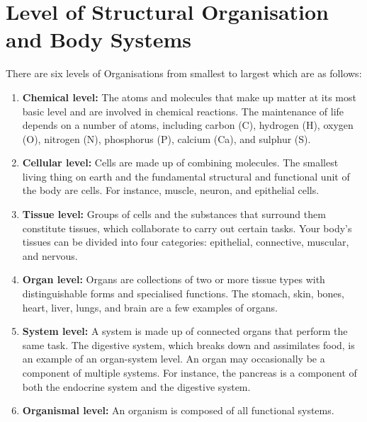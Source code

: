 \documentclass[12pt]{article}
\begin{document}
\section{Level of Structural Organisation and Body Systems}
There are six levels of Organisations from smallest to largest which are as follows:
\begin{enumerate}
    \item \textbf{Chemical level:} The atoms and molecules that make up matter at its most basic level and are involved in chemical reactions. The maintenance of life depends on a number of atoms, including carbon (C), hydrogen (H), oxygen (O), nitrogen (N), phosphorus (P), calcium (Ca), and sulphur (S).
    \item \textbf{Cellular level:} Cells are made up of combining molecules. The smallest living thing on earth and the fundamental structural and functional unit of the body are cells. For instance, muscle, neuron, and epithelial cells.
    \item \textbf{Tissue level:} Groups of cells and the substances that surround them constitute tissues, which collaborate to carry out certain tasks. Your body's tissues can be divided into four categories: epithelial, connective, muscular, and nervous. 
    \item \textbf{Organ level:} Organs are collections of two or more tissue types with distinguishable forms and specialised functions. The stomach, skin, bones, heart, liver, lungs, and brain are a few examples of organs.
    \item \textbf{System level:}  A system is made up of connected organs that perform the same task. The digestive system, which breaks down and assimilates food, is an example of an organ-system level. An organ may occasionally be a component of multiple systems. For instance, the pancreas is a component of both the endocrine system and the digestive system.

    \item \textbf{Organismal level:} An organism is composed of all functional systems.
\end{enumerate}
\end{document}
